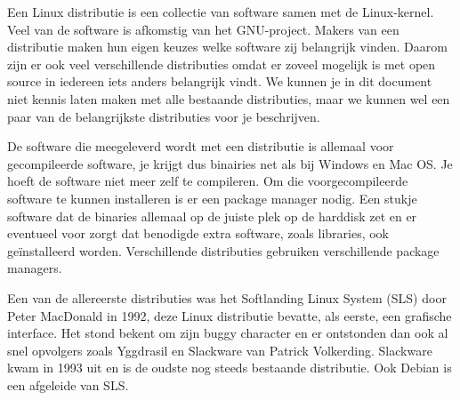 Een Linux distributie is een collectie van software samen met de Linux-kernel. Veel van de software is afkomstig van het GNU-project. Makers van een distributie maken hun eigen keuzes welke software zij belangrijk vinden. Daarom zijn er ook veel verschillende distributies omdat er zoveel mogelijk is met open source in iedereen iets anders belangrijk vindt. We kunnen je in dit document niet kennis laten maken met alle bestaande distributies, maar we kunnen wel een paar van de belangrijkste distributies voor je beschrijven.

De software die meegeleverd wordt met een distributie is allemaal voor gecompileerde software, je krijgt dus binairies net als bij Windows en Mac OS. Je hoeft de software niet meer zelf te compileren. Om die voorgecompileerde software te kunnen installeren is er een package manager nodig. Een stukje software dat de binaries allemaal op de juiste plek op de harddisk zet en er eventueel voor zorgt dat benodigde extra software, zoals libraries, ook ge\"installeerd worden. Verschillende distributies gebruiken verschillende package managers.

Een van de allereerste distributies was het Softlanding Linux System (SLS) door Peter MacDonald in 1992, deze Linux distributie bevatte, als eerste, een grafische interface. Het stond bekent om zijn buggy character en er ontstonden dan ook al snel opvolgers zoals Yggdrasil en Slackware van Patrick Volkerding. Slackware kwam in 1993 uit en is de oudste nog steeds bestaande distributie. Ook Debian is een afgeleide van SLS.
